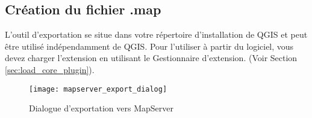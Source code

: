 \subsection{Création du fichier .map}


L'outil  d'exportation se situe dans votre répertoire d'installation de QGIS et peut être utilisé indépendamment de QGIS. Pour l'utiliser à partir du logiciel, vous devez charger l'extension en utilisant le Gestionnaire d'extension. (Voir Section \ref{sec:load_core_plugin}).


\begin{figure}[ht]
\centering
  \texttt{[image: mapserver\_export\_dialog]}
  \caption{Dialogue d'exportation vers MapServer \nixcaption} \label{fig:mapserver_export_dialog}
\end{figure}


